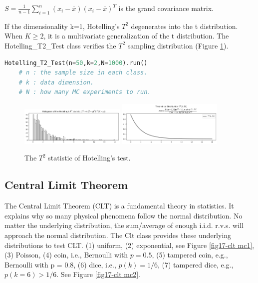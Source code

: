 \documentclass[11pt, letterpaper]{article}
\begin{document}
\noindent $S=\frac{1}{n-1}\sum_{i=1}^{n}(x_{i}-\overline{x})(x_{i}-\overline{x})^T$  is the grand covariance matrix.

If the dimensionality k=1, Hotelling's $T^2$ degenerates into the t distribution.
When $K \geq 2$, it is a multivariate generalization of the t distribution. The Hotelling\_T2\_Test
class verifies the $T^2$ sampling distribution (Figure \ref{fig:Hotelling T mc}).

\lstset{
    basicstyle=\footnotesize,
    xleftmargin=-1em,aboveskip=0.5em,belowskip=0.5em
}
\begin{lstlisting}[language=python]
    Hotelling_T2_Test(n=50,k=2,N=1000).run()
    # n : the sample size in each class.
    # k : data dimension.
    # N : how many MC experiments to run.
    \end{lstlisting}

\begin{figure}[htbp]
    \centering
    \vspace{-0.5em}
    \includegraphics[width=0.45\textwidth]{fig16-Hotelling T mc1.png}
    \includegraphics[width=0.45\textwidth]{fig16-Hotelling T mc2.png}
    \caption{The $T^2$ statistic of Hotelling's test.}
    \label{fig:Hotelling T mc}
\end{figure}

\subsection{Central Limit Theorem}
The Central Limit Theorem (CLT) is a fundamental theory in statistics. It explains why so many physical
phenomena follow the normal distribution. No matter the underlying distribution, the sum/average of enough
i.i.d. r.v.s. will approach the normal distribution. The Clt class provides these underlying distributions
to test CLT. (1) uniform, (2) exponential, see Figure \ref{fig17-clt mc1}, (3) Poisson, (4) coin, i.e., Bernoulli with
$p = 0.5$, (5) tampered coin, e.g., Bernoulli with p = 0.8, (6) dice, i.e., $p(k) = 1/6$, (7) tampered dice, e.g.,
$p(k=6) > 1/6$. See Figure \ref{fig17-clt mc2}.
\end{document}
